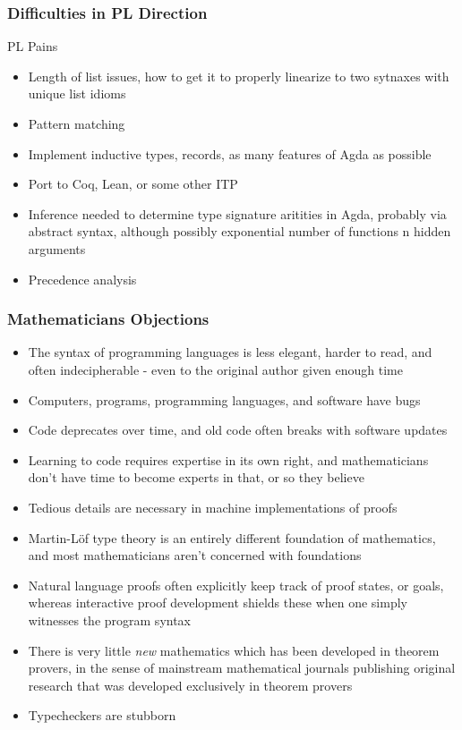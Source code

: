 \documentclass[9pt]{beamer}
\begin{document}
\begin{frame}
\frametitle{Difficulties in PL Direction}
\begin{block}{PL Pains}
\begin{itemize}
\item Length of list issues, how to get it to properly linearize to two sytnaxes with unique list idioms 
\item Pattern matching
\item Implement inductive types, records, as many features of Agda as possible
\item Port to Coq, Lean, or some other ITP
\item Inference needed to determine type signature aritities in Agda, probably
  via abstract syntax, although possibly exponential number of functions n hidden arguments
\item Precedence analysis
\end{itemize}
\end{block}
\end{frame}


\begin{frame}
\frametitle{Mathematicians Objections}
\begin{itemize}
\item The syntax of programming languages is less elegant, harder to read, and often indecipherable - even to the original author given enough time
\item Computers, programs, programming languages, and software have bugs
\item Code deprecates over time, and old code often breaks with software updates
\item Learning to code requires expertise in its own right, and mathematicians don't have time to become experts in that, or so they believe
\item Tedious details are necessary in machine implementations of proofs 
\item Martin-Löf type theory is an entirely different foundation of mathematics, and most mathematicians aren't concerned with foundations
\item Natural language proofs often explicitly keep track of proof states, or goals, whereas interactive proof development shields these when one simply witnesses the program syntax
\item There is very little \emph{new} mathematics which has been developed in theorem provers, in the sense of mainstream mathematical journals publishing original research that was developed exclusively in theorem provers
\item Typecheckers are stubborn
\end{itemize}
\end{frame}
\end{document}
